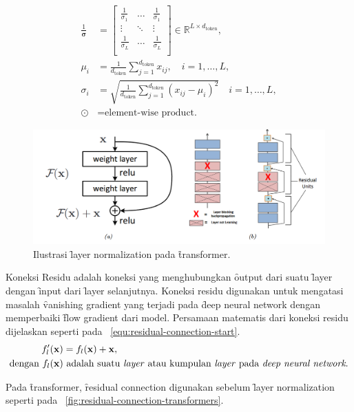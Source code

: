 \begin{align}
		\frac{1}{\bm{\sigma}} &= \begin{bmatrix}
		\frac{1}{\sigma_1} &\dots & \frac{1}{\sigma_1} \\
		\vdots & \ddots &\vdots \\
		\frac{1}{\sigma_L} &\dots & \frac{1}{\sigma_L} \\
		\end{bmatrix} \in \mathbb{R}^{L\times d_{\text{token}}}, \\
		\mu_i &= \frac{1}{d_\text{token}}\sum_{j=1}^{d_{\text{token}}} x_{ij},\quad i=1,\dots,L, \\
		\sigma_i &= \sqrt{\frac{1}{d_{\text{token}}} \sum_{j=1}^{d_{\text{token}}} (x_{ij}-\mu_i)^2}\quad i = 1,\dots, L, \\
		\label{equ:layer-normalization-end}
		\odot &= \text{element-wise product.} 
		\end{align}
	\begin{figure}
			\centering
			\includegraphics[width=1\textwidth]{assets/pics/residual-connection.png}
			\caption{Ilustrasi \f{layer normalization} pada \f{transformer}.}
			\label{fig:residual-connection}
	\end{figure}

	Koneksi Residu adalah koneksi yang menghubungkan \f{output} dari suatu \f{layer} dengan \f{input} dari \f{layer} selanjutnya. Koneksi residu digunakan untuk mengatasi masalah \f{vanishing gradient} yang terjadi pada \f{deep neural network} dengan memperbaiki \f{flow gradient} dari model. Persamaan matematis dari koneksi residu dijelaskan seperti pada \equ~\ref{equ:residual-connection-start}.
	\begin{align}
		\label{equ:residual-connection-start}
		f_l'(\mathbf{x}) &= f_l(\mathbf{x}) + \mathbf{x}, \\
		\text{dengan } f_l(\mathbf{x}) &\text{ adalah suatu \textit{layer} atau kumpulan \textit{layer} pada \textit{deep neural network}.}
	\end{align}

	Pada \f{transformer}, \f{residual connection} digunakan sebelum \f{layer normalization} seperti pada \pic~\ref{fig:residual-connection-transformers}.

